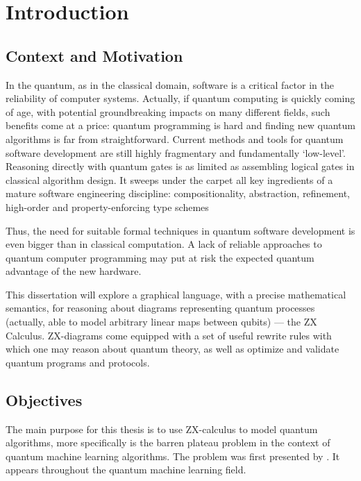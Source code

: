 \chapter{Introduction}


\section{Context and Motivation}

In the quantum, as in the classical domain, software is a critical factor in the reliability of computer systems. Actually, if quantum computing is quickly coming of age, with potential groundbreaking impacts on many different fields, such benefits come at a price: quantum programming is hard and finding new quantum algorithms is far from straightforward. Current methods and tools for quantum software development are still highly fragmentary and fundamentally ‘low-level’. Reasoning directly with quantum gates is as limited as assembling logical gates in classical algorithm design. It sweeps under the carpet all key ingredients of a mature software engineering discipline: compositionality, abstraction, refinement, high-order and property-enforcing type schemes

Thus, the need for suitable formal techniques in quantum software development is even bigger than in classical computation. A lack of reliable approaches to quantum computer programming may put at risk the expected quantum advantage of the new hardware.

This dissertation will explore a graphical language, with a precise mathematical semantics, for reasoning about diagrams representing quantum processes (actually, able to model arbitrary linear maps between qubits) --- the ZX Calculus. ZX-diagrams come equipped with a set of useful rewrite rules with which one may reason about quantum theory, as well as optimize and validate quantum programs and protocols.

\section{Objectives}

The main purpose for this thesis is to use ZX-calculus to model quantum algorithms, more specifically is the barren plateau problem in the context of quantum machine learning algorithms. The problem was first presented by \cite{McClean_2018}. It appears throughout the quantum machine learning field.


